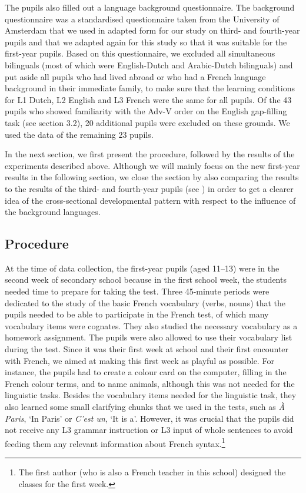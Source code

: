 \documentclass[output=paper]{langsci/langscibook}
\begin{document}
The pupils also filled out a language background questionnaire. The background questionnaire was a standardised questionnaire taken from the University of Amsterdam that we used in adapted form for our study on third- and fourth-year pupils and that we adapted again for this study so that it was suitable for the first-year pupils. Based on this questionnaire, we excluded all simultaneous bilinguals (most of which were English-Dutch and Arabic-Dutch bilinguals) and put aside all pupils who had lived abroad or who had a French language background in their immediate family, to make sure that the learning conditions for L1 Dutch, L2 English and L3 French were the same for all pupils. Of the 43 pupils who showed familiarity with the Adv-V order on the English gap-filling task (see section 3.2), 20 additional pupils were excluded on these grounds. We used the data of the remaining 23 pupils.

  In the next section, we first present the procedure, followed by the results of the experiments described above. Although we will mainly focus on the new first-year results in the following section, we close the section by also comparing the results to the results of the third- and fourth-year pupils (see ) in order to get a clearer idea of the cross-sectional developmental pattern with respect to the influence of the background languages.

\subsection{{Procedure}}
\label{sec:stadt:3.4}

At the time of data collection, the first-year pupils (aged 11–13) were in the second week of secondary school because in the first school week, the students needed time to prepare for taking the test. Three 45-minute periods were dedicated to the study of the basic French vocabulary (verbs, nouns) that the pupils needed to be able to participate in the French test, of which many vocabulary items were cognates. They also studied the necessary vocabulary as a homework assignment. The pupils were also allowed to use their vocabulary list during the test. Since it was their first week at school and their first encounter with French, we aimed at making this first week as playful as possible. For instance, the pupils had to create a colour card on the computer, filling in the French colour terms, and to name animals, although this was not needed for the linguistic tasks. Besides the vocabulary items needed for the linguistic task, they also learned some small clarifying chunks that we used in the tests, such as \textit{À Paris}, ‘In Paris’ or \textit{C’est un}, ‘It is a’. However, it was crucial that the pupils did not receive any L3 grammar instruction or L3 input of whole sentences to avoid feeding them any relevant information about French syntax.\footnote{The first author (who is also a French teacher in this school) designed the classes for the first week.}
\end{document}
